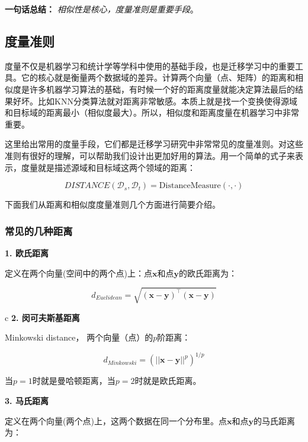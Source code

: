 \textbf{一句话总结：} \textit{相似性是核心，度量准则是重要手段}。

\subsection{度量准则}

度量不仅是机器学习和统计学等学科中使用的基础手段，也是迁移学习中的重要工具。它的核心就是衡量两个数据域的差异。计算两个向量（点、矩阵）的距离和相似度是许多机器学习算法的基础，有时候一个好的距离度量就能决定算法最后的结果好坏。比如KNN分类算法就对距离非常敏感。本质上就是找一个变换使得源域和目标域的距离最小（相似度最大）。所以，相似度和距离度量在机器学习中非常重要。

这里给出常用的度量手段，它们都是迁移学习研究中非常常见的度量准则。对这些准则有很好的理解，可以帮助我们设计出更加好用的算法。用一个简单的式子来表示，度量就是描述源域和目标域这两个领域的距离：

\begin{equation}
	\label{eq-distance}
	DISTANCE(\mathcal{D}_s,\mathcal{D}_t) = \mathrm{DistanceMeasure}(\cdot,\cdot)
\end{equation}

下面我们从距离和相似度度量准则几个方面进行简要介绍。

\subsubsection{常见的几种距离}

\textbf{1. 欧氏距离}

定义在两个向量(空间中的两个点)上：点$\mathbf{x}$和点$\mathbf{y}$的欧氏距离为：

\begin{equation}
	\label{eq-dist-eculidean}
	d_{Euclidean}=\sqrt{(\mathbf{x}-\mathbf{y})^\top (\mathbf{x}-\mathbf{y})}
\end{equation}

c
\textbf{2. 闵可夫斯基距离} 

Minkowski distance， 两个向量（点）的$p$阶距离：

\begin{equation}
	\label{eq-dist-minkowski}
	d_{Minkowski}=(||\mathbf{x}-\mathbf{y}||^p)^{1/p}
\end{equation}

当$p=1$时就是曼哈顿距离，当$p=2$时就是欧氏距离。

\textbf{3. 马氏距离}

定义在两个向量(两个点)上，这两个数据在同一个分布里。点$\mathbf{x}$和点$\mathbf{y}$的马氏距离为：

